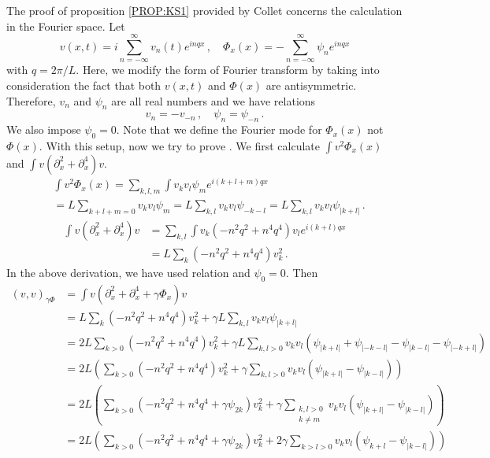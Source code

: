 The proof of proposition \ref{PROP:KS1} 
provided by Collet \etal{} concerns the calculation in
the Fourier space. Let 
\[
  v(x, t) = i\sum_{n=-\infty}^\infty v_n(t) e^{inqx}\,,\quad
  \Phi_x(x) = -\sum_{n=-\infty}^\infty \psi_n e^{inqx}
\]
with $q=2\pi/L$. Here, we modify the form of Fourier transform by taking 
into consideration the fact that both $v(x, t)$ and $\Phi(x)$ are 
antisymmetric. Therefore, $v_n$ and $\psi_n$ are all real numbers and we have 
relations
\begin{equation}
  v_n = -v_{-n} \,,\quad \psi_n = \psi_{-n}
  \,.
  \label{eq:ks_prop1_fm}
\end{equation}
We also impose $\psi_0 = 0$.
Note that we define the Fourier mode for $\Phi_x(x)$ not $\Phi(x)$. 
With this setup, now we try to prove . 
We first calculate $\int v^2 \Phi_x(x)$ and 
$\int v(\partial_x^2 + \partial_x^4)v$.
\begin{align*}
  & \int v^2 \Phi_x(x) 
    = \sum_{k, l, m}\int v_kv_l\psi_m e^{i(k+l+m)qx} \\
  & = L\sum_{k+l+m=0}v_kv_l\psi_m 
    = L\sum_{k, l}v_kv_l\psi_{-k-l} 
    = L\sum_{k, l}v_kv_l\psi_{|k+l|}
    \,.
\end{align*}
\begin{align*}
  \int v(\partial_x^2 + \partial_x^4)v
  & = \sum_{k, l}\int v_k(-n^2q^2+n^4q^4)v_l e^{i(k+l)qx} \\
  & = L \sum_k (-n^2q^2+n^4q^4)v_k^2
    \,.
\end{align*}
In the above derivation, we have used relation  
and $\psi_0 = 0$. Then
\begin{align}
  (v, v)_{\gamma\Phi} 
  & = \int v(\partial_x^2 + \partial_x^4 + \gamma\Phi_x)v \nonumber \\
  & = L \sum_k (-n^2q^2+n^4q^4)v_k^2 + \gamma L\sum_{k, l}v_kv_l\psi_{|k+l|} \nonumber \\
  & = 2L \sum_{k>0} (-n^2q^2+n^4q^4)v_k^2 + \gamma L\sum_{k, l >0}
    v_kv_l(\psi_{|k+l|} + \psi_{|-k-l|} - \psi_{|k-l|} - \psi_{|-k+l|})  \nonumber \\
  & = 2L \left( \sum_{k>0} (-n^2q^2+n^4q^4)v_k^2 + \gamma \sum_{k, l >0}
    v_kv_l(\psi_{|k+l|} - \psi_{|k-l|} ) \right)  \nonumber \\
  & = 2L \left( \sum_{k>0} (-n^2q^2+n^4q^4 + \gamma\psi_{2k})v_k^2 + 
    \gamma \sum_{\substack{k, l >0 \\ k\neq m}}
  v_kv_l(\psi_{|k+l|} - \psi_{|k-l|} ) \right)  \nonumber \\
  & = 2L \left( \sum_{k>0} (-n^2q^2+n^4q^4 + \gamma\psi_{2k})v_k^2 + 
    2\gamma \sum_{k>l>0}
    v_kv_l(\psi_{k+l} - \psi_{|k-l|} ) \right) \label{eq:ks_prop1_left}
\end{align}
